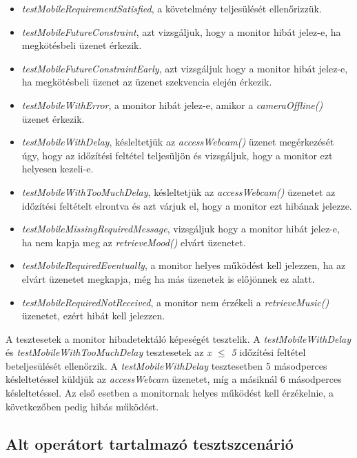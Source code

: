 \begin{itemize}
    \item \textit{testMobileRequirementSatisfied}, a követelmény teljesülését ellenőrizzük.
    \item \textit{testMobileFutureConstraint}, azt vizsgáljuk, hogy a monitor hibát jelez-e, ha megkötésbeli üzenet érkezik.
    \item \textit{testMobileFutureConstraintEarly}, azt vizsgáljuk hogy a monitor hibát jelez-e, ha megkötésbeli üzenet az üzenet szekvencia elején érkezik.
    \item \textit{testMobileWithError}, a monitor hibát jelez-e, amikor a \textit{cameraOffline()} üzenet érkezik.
    \item \textit{testMobileWithDelay}, késleltetjük az \textit{accessWebcam()} üzenet megérkezését úgy, hogy az időzítési feltétel teljesüljön és vizsgáljuk, hogy a monitor ezt helyesen kezeli-e.
    \item \textit{testMobileWithTooMuchDelay}, késleltetjük az \textit{accessWebcam()} üzenetet  az időzítési feltételt elrontva és azt várjuk el, hogy a monitor ezt hibának jelezze.
    \item \textit{testMobileMissingRequiredMessage}, vizsgáljuk hogy a monitor hibát jelez-e, ha nem kapja meg az \textit{retrieveMood()} elvárt üzenetet.
    \item \textit{testMobileRequiredEventually}, a monitor helyes működést kell jelezzen, ha az elvárt üzenetet megkapja, még ha más üzenetek is előjönnek ez alatt.
    \item \textit{testMobileRequiredNotReceived}, a monitor nem érzékeli a \textit{retrieveMusic()} üzenetet, ezért hibát kell jelezzen.
\end{itemize}

A tesztesetek a monitor hibadetektáló képeségét tesztelik.
A \textit{testMobileWithDelay} és \textit{testMobileWithTooMuchDelay} tesztesetek az \textit{x $\leq$ 5} időzítési feltétel beteljesülését ellenőrzik.
A \textit{testMobileWithDelay} tesztesetben 5 másodperces késleltetéssel küldjük az \textit{accessWebcam} üzenetet, míg a másiknál 6 másodperces késleltetéssel.
Az első esetben a monitornak helyes működést kell érzékelnie, a következőben pedig hibás működést.

\subsection{Alt operátort tartalmazó tesztszcenárió}

